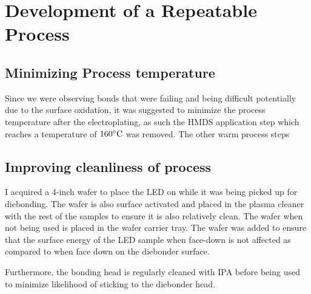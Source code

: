 \section{Development of a Repeatable Process}

\subsection{Minimizing Process temperature}
Since we were observing bonds that were failing and being difficult potentially due to the surface oxidation, it was suggested to minimize the process temperature after the electroplating, as such the HMDS application step which reaches a temperature of $160\dC$ was removed. The other warm process steps


\subsection{Improving cleanliness of process}

I acquired a 4-inch wafer to place the LED on while it was being picked up for diebonding. The wafer is also surface activated and placed in the plasma cleaner with the rest of the samples to ensure it is also relatively clean. The wafer when not being used is placed in the wafer carrier tray.
The wafer was added to ensure that the surface energy of the LED sample when face-down is not affected as compared to when face down on the diebonder surface.

Furthermore, the bonding head is regularly cleaned with IPA before being used to minimize likelihood of sticking to the diebonder head.
